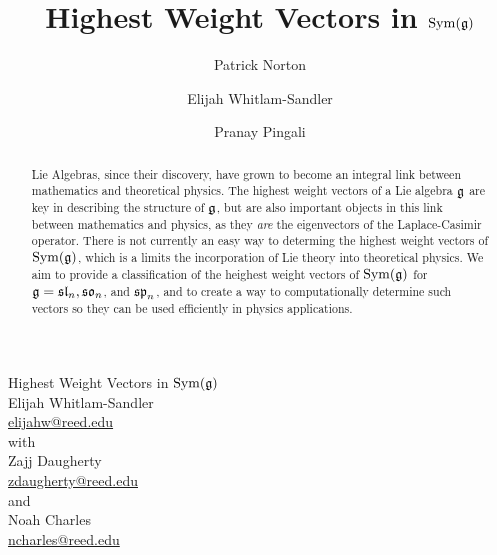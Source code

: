 \documentclass[11pt, reqno]{amsart}
\title{Highest Weight Vectors in $\operatorname{Sym}(\mathfrak{g})$}
\author{Patrick Norton \and Elijah Whitlam-Sandler \and Pranay Pingali}
\begin{document}
\thispagestyle{empty}
\setcounter{page}{0}
\vspace*{\fill}
\begin{center}
  Highest Weight Vectors in $\operatorname{Sym}(\mathfrak{g})$\\[10pt]
  Elijah Whitlam-Sandler\\
  \href{mailto:elijahw@reed.edu}{elijahw@reed.edu}\\[10pt]
  with\\[10pt]
  Zajj Daugherty\\
  \href{mailto:zdaugherty@reed.edu}{zdaugherty@reed.edu}\\[10pt]
  and\\[10pt]
  Noah Charles\\
  \href{mailto:ncharles@reed.edu}{ncharles@reed.edu}
\end{center}
\vspace*{\fill}
\newpage

\begin{abstract}
  Lie Algebras, since their discovery, have grown to become an integral link between mathematics and theoretical physics. The highest weight vectors of a Lie algebra $\mathfrak{g}$ are key in describing the structure of $\mathfrak{g}$, but are also important objects in this link between mathematics and physics, as they \emph{are} the eigenvectors of the Laplace-Casimir operator. There is not currently an easy way to determing the highest weight vectors of $\operatorname{Sym}(\mathfrak{g})$, which is a limits the incorporation of Lie theory into theoretical physics. We aim to provide a classification of the heighest weight vectors of $\operatorname{Sym}(\mathfrak{g})$ for $\mathfrak{g}=\mathfrak{sl}_n,\mathfrak{so}_n$, and $\mathfrak{sp}_n$, and to create a way to computationally determine such vectors so they can be used efficiently in physics applications.
\end{abstract}



\maketitle
\end{document}
